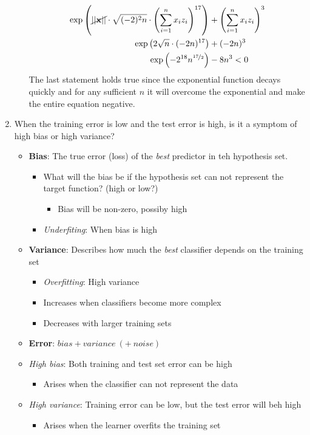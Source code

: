 \documentclass{article}
\newcommand{\Norm}[1]{\left|\left| #1\right|\right|}
\begin{document}
\begin{enumerate}
\begin{itemize}
\begin{align}
\exp\left(\cancel{\Norm{\mathbf{x}}}\cdot \sqrt{(-2)^{2}n}\cdot \left(\sum_{i=1}^{n}x_{i}z_{i}\right)^{17}\right) &+ \left(\sum_{i=1}^{n}x_{i}z_{i}\right)^{3}\\
\exp\left(2\sqrt{n}\cdot (-2n)^{17}\right) &+ (-2n)^{3}\\
\exp\left(-2^{18}n^{\unitfrac{17}{2}}\right) &- 8n^{3} < 0
\end{align}
The last statement holds true since the exponential function decays quickly and for any sufficient $n$ it will overcome the exponential and make the entire equation negative.
\end{itemize}


\item When the training error is low and the test error is high, is it a symptom of high bias or high variance?

\begin{itemize}
\item {\bf Bias}: The true error (loss) of the {\em best} predictor in teh hypothesis set.
\begin{itemize}
\item What will the bias be if the hypothesis set can not represent the target function? (high or low?)
\begin{itemize}
\item Bias will be non-zero, possiby high
\end{itemize}
\item {\em Underfiting}: When bias is high
\end{itemize}
\item {\bf Variance}: Describes how much the {\em best} classifier depends on the training set
\begin{itemize}
\item {\em Overfitting}: High variance
\item Increases when classifiers become more complex
\item Decreases with larger training sets
\end{itemize}
\item {\bf Error}: $bias + variance\ (+\ noise)$
\item {\em High bias}: Both training and test set error can be high
\begin{itemize}
\item Arises when the classifier can not represent the data
\end{itemize}
\item {\em High variance}: Training error can be low, but the test error will beh high
\begin{itemize}
\item Arises when the learner overfits the training set
\end{itemize}
\end{itemize}



\end{enumerate}
\end{document}
